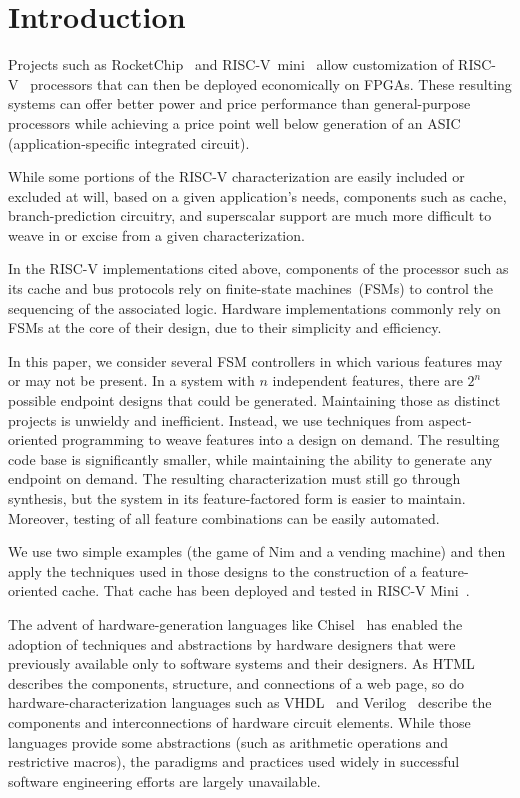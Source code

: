 \documentclass[conference]{IEEEtran}
\begin{document}
\maketitle

\section{Introduction}

Projects such as RocketChip~\cite{chisel:riscv} and RISC-V~mini~\cite{Kim:22} allow customization of RISC-V~\cite{riscvwebsite} processors that can then be deployed economically on FPGAs.  These resulting systems can offer better power and price performance than general-purpose processors while achieving a price point well below generation of an ASIC (application-specific integrated circuit).

While some portions of the RISC-V characterization are easily included or excluded at will, based on a given application's needs, components such as cache, branch-prediction circuitry, and superscalar support are much more difficult to weave in or excise from a given characterization.

In the RISC-V implementations cited above, components of the processor such as its cache and bus protocols rely on finite-state machines~(FSMs) to control the sequencing of the associated logic.   Hardware implementations commonly rely on FSMs at the core of their design, due to their simplicity and efficiency.

In this paper, we consider several FSM controllers in which various features may or may not be present.  In a system with $n$ independent features, there are $2^n$ possible endpoint designs that could be generated.  Maintaining those as distinct projects is unwieldy and inefficient.  Instead, we use techniques from aspect-oriented programming to weave features into a design on demand.  The resulting code base is significantly smaller, while maintaining the ability to generate any endpoint on demand.   The resulting characterization must still go through synthesis, but the system in its feature-factored form is easier to maintain.  Moreover, testing of all feature combinations can be easily automated.

We use two simple examples (the game of Nim and a vending machine) and then apply the techniques used in those designs to the construction of a feature-oriented cache.  That cache has been deployed and tested in RISC-V Mini~\cite{Kim:22}.

The advent of hardware-generation languages like Chisel~\cite{chisel:article} has enabled the adoption of techniques and abstractions by hardware designers that were previously available only to software systems and their designers. As HTML describes the components, structure, and connections of a web page, so do hardware-characterization languages such as VHDL~\cite{vhdl} and Verilog~\cite{verilog} describe the components and interconnections of hardware circuit elements. While those languages provide some abstractions (such as arithmetic operations and restrictive macros), the paradigms and practices used widely in successful software engineering efforts are largely unavailable.
\end{document}
